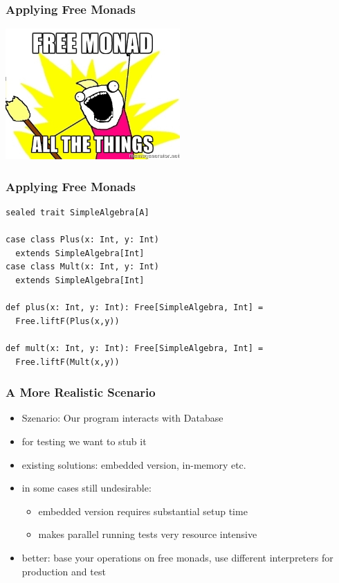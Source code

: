 \documentclass{beamer}
\begin{document}
\begin{frame}
  \frametitle{Applying Free Monads}
  \begin{center}
    \includegraphics[height=5cm]{pics/free-monad-all.jpg}
  \end{center}
\end{frame}

\begin{frame}[fragile]
  \frametitle{Applying Free Monads}
\begin{verbatim}
sealed trait SimpleAlgebra[A]

case class Plus(x: Int, y: Int)
  extends SimpleAlgebra[Int]
case class Mult(x: Int, y: Int)
  extends SimpleAlgebra[Int]

def plus(x: Int, y: Int): Free[SimpleAlgebra, Int] =
  Free.liftF(Plus(x,y))

def mult(x: Int, y: Int): Free[SimpleAlgebra, Int] =
  Free.liftF(Mult(x,y))
\end{verbatim}
\end{frame}

\begin{frame}
  \frametitle{A More Realistic Scenario}
  \begin{itemize}
  \item Szenario: Our program interacts with Database
  \item<1> for testing we want to stub it
  \item<1> existing solutions: embedded version, in-memory etc.
  \item<2> in some cases still undesirable:
    \begin{itemize}
    \item embedded version requires substantial setup time
    \item makes parallel running tests very resource intensive
    \end{itemize}
  \item<2> better: base your operations on free monads, use different
    interpreters for production and test
  \end{itemize}
\end{frame}
\end{document}
